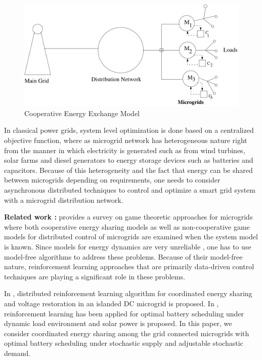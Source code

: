 \begin{figure}[thpb]
      \centering
      \includegraphics[scale=0.4]{powergrid2.pdf}
      \caption{Cooperative Energy Exchange Model}
      \label{gridmodel}
\end{figure}

In classical power grids, system level optimization is done based on a centralized
objective function, where as 
microgrid network has heterogeneous nature right from the manner in which electricity
is generated such as from wind turbines, solar farms and diesel generators
to energy storage devices such as batteries and capacitors.
 Because of this heterogeneity and the fact that energy can be shared between microgrids depending
on requirements, one needs to consider asynchronous distributed techniques 
 to control and optimize a smart grid system
with a microgrid distribution network.

\textbf{Related work :} \cite{saad2012game} provides a survey on game theoretic approaches for microgrids where both cooperative energy sharing models as well as non-cooperative game models for distributed control of microgrids are examined when the system model is known. Since  models for energy dynamics are very unreliable \cite{zamora2010controls}, one has to use model-free algorithms to address these problems.  Because of their model-free nature, reinforcement learning \cite{sutton1998reinforcement} approaches that are primarily data-driven control techniques are playing a significant role in these problems.

In \cite{zifadistributed}, distributed reinforcement learning algorithm for coordinated energy sharing and voltage restoration in an islanded DC microgrid is proposed. In \cite{leo2014reinforcement}, reinforcement learning has been applied for optimal battery scheduling under  dynamic load environment and solar power is proposed. In this paper, we  consider coordinated energy sharing among the grid connected microgrids with optimal battery scheduling under stochastic supply and adjustable stochastic demand.

